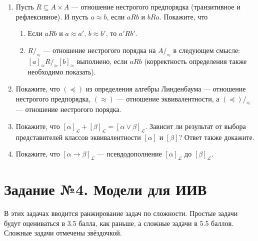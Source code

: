\documentclass[10pt,a4paper,oneside]{article}
\begin{document}
\begin{enumerate}
\item Пусть $R \subseteq A\times A$ --- отношение нестрогого предпорядка (транзитивное и рефлексивное). И пусть
$a \approx b$, если $aRb$ и $bRa$. Покажите, что 
\begin{enumerate}
\item Если $aRb$ и $a \approx a'$, $b \approx b'$, то $a'Rb'$.
\item $R/_\approx$ --- отношение нестрогого порядка на $A/_\approx$ в следующем смысле: $[a]_\approx R/_\approx [b]_\approx$ выполнено, если $aRb$
(корректность определения также необходимо показать).
\end{enumerate}

\item Покажите, что $(\preceq)$ из определения алгебры Линденбаума --- отношение нестрогого предпорядка, $(\approx)$ --- отношение эквивалентности, а
$(\preceq)/_\approx$ --- отношение нестрогого порядка.

\item Покажите, что $[\alpha]_\mathcal{L} + [\beta]_\mathcal{L} = [\alpha\vee\beta]_\mathcal{L}$.
Зависит ли результат от выбора представителей классов эквивалентности $[\alpha]$ и $[\beta]$? Ответ также докажите.
\item Покажите, что $[\alpha\rightarrow\beta]_\mathcal{L}$ --- псевдодополнение $[\alpha]_\mathcal{L}$ до $[\beta]_\mathcal{L}$.
\end{enumerate}

\section*{Задание №4. Модели для ИИВ}

В этих задачах вводится ранжирование задач по сложности. Простые задачи будут оцениваться в 3.5 балла, как раньше, а
сложные задачи в 5.5 баллов. Сложные задачи отмечены звёздочкой.
\end{document}
